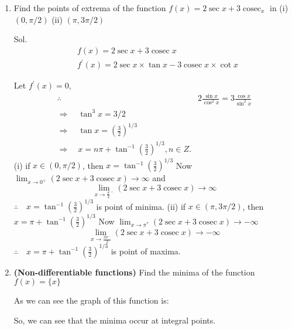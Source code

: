 \begin{enumerate}
    \item \begin{outline}
        Find the points of extrema of the function $f(x)=2 \sec x+3 \operatorname{cosec}_x$ in
(i) $(0, \pi / 2)$
(ii) $(\pi, 3 \pi / 2)$
    \end{outline}

Sol.
$$
\begin{aligned}
& f(x)=2 \sec x+3 \operatorname{cosec} x \\
& f^{\prime}(x)=2 \sec x \times \tan x-3 \operatorname{cosec} x \times \cot x
\end{aligned}
$$

Let $f^{\prime}(x)=0$,
$$
\begin{array}{ll}
\therefore \quad & 2 \frac{\sin x}{\cos ^2 x}=3 \frac{\cos x}{\sin ^2 x} \\
\Rightarrow \quad \tan ^3 x=3 / 2 \\
\Rightarrow \quad \tan x=\left(\frac{3}{2}\right)^{1 / 3} \\
\Rightarrow \quad x=n \pi+\tan ^{-1}\left(\frac{3}{2}\right)^{1 / 3}, n \in Z .
\end{array}
$$
(i) if $x \in(0, \pi / 2)$, then $x=\tan ^{-1}\left(\frac{3}{2}\right)^{1 / 3}$
Now $\lim _{x \rightarrow 0^{+}}(2 \sec x+3 \operatorname{cosec} x) \rightarrow \infty$ and
$$
\lim _{x \rightarrow \frac{\pi}{2}^{-}}(2 \sec x+3 \operatorname{cosec} x) \rightarrow \infty
$$
$\therefore \quad x=\tan ^{-1}\left(\frac{3}{2}\right)^{1 / 3}$ is point of minima.
(ii) if $x \in(\pi, 3 \pi / 2)$, then $x=\pi+\tan ^{-1}\left(\frac{3}{2}\right)^{1 / 3}$
Now $\lim _{x \rightarrow \pi^*}(2 \sec x+3 \operatorname{cosec} x) \rightarrow-\infty$
$$
\lim _{x \rightarrow \frac{3 \pi^{-}}{2}}(2 \sec x+3 \operatorname{cosec} x) \rightarrow-\infty
$$
$\therefore \quad x=\pi+\tan ^{-1}\left(\frac{3}{2}\right)^{1 / 3}$ is point of maxima.


\item \textbf{(Non-differentiable functions)} Find the minima of the function $f(x)=\{x\}$


As we can see the graph of this function is: 


So, we can see that the minima occur at integral points. 
\end{enumerate}